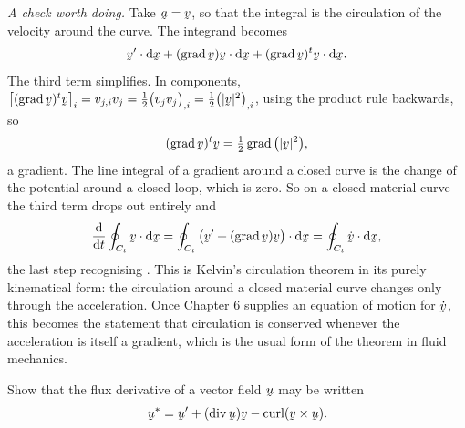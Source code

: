 \begin{solution}
\emph{A check worth doing.} Take $\ba=\bv$, so that the integral is the
circulation of the velocity around the curve. The integrand becomes
\[
   \ip{\bv'}{\dl\bx}+\ip{(\grad\bv)\bv}{\dl\bx}
   +\ip{(\grad\bv)^{t}\bv}{\dl\bx}.
\]
The third term simplifies. In components,
$\big[(\grad\bv)^{t}\bv\big]_{i}=v_{j,i}v_{j}
=\tfrac12\big(v_{j}v_{j}\big)_{,i}=\tfrac12\big(|\bv|^{2}\big)_{,i}$,
using the product rule backwards, so
\[
   (\grad\bv)^{t}\bv=\tfrac12\grad\big(|\bv|^{2}\big),
\]
a gradient. The line integral of a gradient around a closed curve is the
change of the potential around a closed loop, which is zero. So on a
closed material curve the third term drops out entirely and
\[
   \frac{\dl}{\dl t}\oint_{C_{t}}\ip\bv{\dl\bx}
   =\oint_{C_{t}}\ip{\big(\bv'+(\grad\bv)\bv\big)}{\dl\bx}
   =\oint_{C_{t}}\ip{\dot\bv}{\dl\bx},
\]
the last step recognising . This is Kelvin's circulation theorem
in its purely kinematical form: the circulation around a closed material
curve changes only through the acceleration. Once Chapter 6 supplies an
equation of motion for $\dot\bv$, this becomes the statement that
circulation is conserved whenever the acceleration is itself a gradient,
which is the usual form of the theorem in fluid mechanics.
\end{solution}

\begin{problem}
Show that the flux derivative of a vector field $\bu$ may be written
\[
   \bu^{*}=\bu'+(\dvg\bu)\bv-\crl(\bv\times\bu).
\]
\end{problem}

